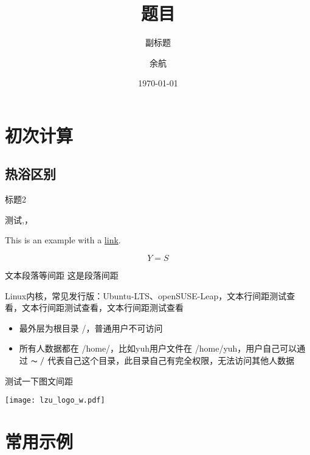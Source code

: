 \documentclass{../../ppt/ldrsimple}
\title{题目}
\subtitle{副标题}
\author[yuh]
{余航}
\institute[ICPCS]
{
机构\\
可以换行
}
\date[\today]{\today}
\begin{document}
\frame{\titlepage}

\section{初次计算}

\subsection*{热浴区别}


\begin{frame}{标题2}

    测试,，

    This is an example with a \href{https://www.example.com}{link}.

    \begin{equation}
        Y=S
    \end{equation}

\end{frame}


\begin{frame}{文本段落等间距}
    这是段落间距

    Linux内核，常见发行版：Ubuntu-LTS、openSUSE-Leap，文本行间距测试查看，文本行间距测试查看，文本行间距测试查看
    \begin{itemize}
        \item 最外层为根目录 /，普通用户不可访问
        \item 所有人数据都在 /home/，比如yuh用户文件在 /home/yuh，用户自己可以通过 $\thicksim/$ 代表自己这个目录，此目录自己有完全权限，无法访问其他人数据
    \end{itemize}

    测试一下图文间距

    \texttt{[image: lzu\_logo\_w.pdf]}

\end{frame}


\section{常用示例}
\end{document}
